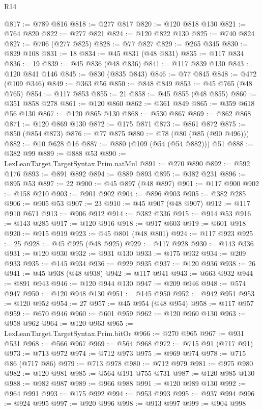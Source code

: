 \begin{lexlean}{R14}
\begin{coremodule}
@817 := @789 @816
@818 := @277 @817
@820 := @120 @818 @130
@821 := @764 @820
@822 := @277 @821
@824 := @120 @822 @130
@825 := @740 @824
@827 := @706 (@277 @825)
@828 := @77 @827
@829 := @265 @345
@830 := @829 @108
@831 := 18
@834 := @45 @831 (@48 @831)
@835 := @117 @834
@836 := 19
@839 := @45 @836 (@48 @836)
@841 := @117 @839 @130
@843 := @120 @841 @146
@845 := @830 (@835 @843)
@846 := @77 @845
@848 := @472 (@109 @346)
@849 := @363 @56
@850 := @848 @849
@853 := @45 @765 (@48 @765)
@854 := @117 @853
@855 := 21
@858 := @45 @855 (@48 @855)
@860 := @351 @858 @278
@861 := @120 @860
@862 := @361 @849
@865 := @359 @618 @56 @130
@867 := @120 @865 @130
@868 := @530 @867
@869 := @862 @868
@871 := @120 @869 @130
@872 := @175 @871
@873 := @861 @872
@875 := @850 (@854 @873)
@876 := @77 @875
@880 := @78 (@80 (@85 (@90 @496)))
@882 := @10 @628 @16
@887 := @880 (@109 (@54 (@54 @882))) @51
@888 := @382 @99
@889 := @888 @53
@890 := LexLeanTarget.TargetSyntax.Prim.natMul
@891 := @270 @890
@892 := @592 @176
@893 := @891 @892
@894 := @889 @893
@895 := @382 @231
@896 := @895 @53
@897 := 22
@900 := @45 @897 (@48 @897)
@901 := @117 @900
@902 := @158 @210
@903 := @901 @902
@904 := @896 @903
@905 := @382 @285
@906 := @905 @53
@907 := 23
@910 := @45 @907 (@48 @907)
@912 := @117 @910 @671
@913 := @906 @912
@914 := @382 @336
@915 := @914 @53
@916 := @143 @285
@917 := @120 @916
@918 := @917 @603
@919 := @601 @918
@920 := @915 @919
@923 := @45 @801 (@48 @801)
@924 := @117 @923
@925 := 25
@928 := @45 @925 (@48 @925)
@929 := @117 @928
@930 := @143 @336
@931 := @120 @930
@932 := @931 @130
@933 := @175 @932
@934 := @209 @933
@935 := @145 @934
@936 := @929 @935
@937 := @120 @936
@938 := 26
@941 := @45 @938 (@48 @938)
@942 := @117 @941
@943 := @663 @932
@944 := @891 @943
@946 := @120 @944 @130
@947 := @209 @946
@948 := @574 @947
@950 := @120 @948 @130
@951 := @145 @950
@952 := @942 @951
@953 := @120 @952
@954 := 27
@957 := @45 @954 (@48 @954)
@958 := @117 @957
@959 := @670 @946
@960 := @601 @959
@962 := @120 @960 @130
@963 := @958 @962
@964 := @120 @963
@965 := LexLeanTarget.TargetSyntax.Prim.bitOr
@966 := @270 @965
@967 := @931 @531
@968 := @566 @967
@969 := @564 @968
@972 := @715 @91 (@717 @91)
@973 := @713 @972
@974 := @712 @973
@975 := @969 @974
@978 := @715 @86 (@717 @86)
@979 := @713 @978
@980 := @712 @979
@981 := @975 @980
@982 := @120 @981
@985 := @564 @191 @755 @731
@987 := @120 @985 @130
@988 := @982 @987
@989 := @966 @988
@991 := @120 @989 @130
@992 := @964 @991
@993 := @175 @992
@994 := @953 @993
@995 := @937 @994
@996 := @924 @995
@997 := @920 @996
@998 := @913 @997
@999 := @904 @998

\end{coremodule}
\end{lexlean}
